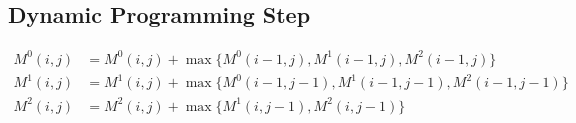 \documentclass{article}
\begin{document}
\begin{appendix}
\subsection{Dynamic Programming Step}
\begin{align*}
M^0(i,j) &= M^0(i,j) + \max\{M^0(i-1,j), M^1(i-1,j), M^2(i-1,j)\} \\
M^1(i,j) &= M^1(i,j) + \max\{M^0(i-1,j-1), M^1(i-1,j-1), M^2(i-1,j-1)\} \\
M^2(i,j) &= M^2(i,j) + \max\{M^1(i,j-1), M^2(i,j-1)\}
\end{align*}

\vspace{-1cm}
\end{appendix}
\end{document}
